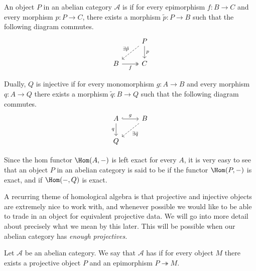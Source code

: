 \documentclass[main.tex]{subfiles}
\begin{document}
\begin{definition}
  \label{def:projective_injective}
  An object $P$ in an abelian category $\mathcal{A}$ is  if for every epimorphism $f\colon B \to C$ and every morphism $p\colon P \to C$, there exists a morphism $\tilde{p}\colon P \to B$ such that the following diagram commutes.
  \begin{equation*}
    \begin{tikzcd}
      & P
      \arrow[d, "p"]
      \arrow[dl, dashed, swap, "\exists\tilde{p}"]
      \\
      B
      \arrow[r, twoheadrightarrow, swap, "f"]
      & C
    \end{tikzcd}
  \end{equation*}

  Dually, $Q$ is injective if for every monomorphism $g\colon A \to B$ and every morphism $q\colon A \to Q$ there exists a morphism $\tilde{q}\colon B \to Q$ such that the following diagram commutes.
  \begin{equation*}
    \begin{tikzcd}
      A
      \arrow[r, hookrightarrow, "g"]
      \arrow[d, swap, "q"]
      & B
      \arrow[dl, dashed, "\exists \tilde{q}"]
      \\
      Q
    \end{tikzcd}
  \end{equation*}
\end{definition}

Since the hom functor $\Hom(A, -)$ is left exact for every $A$, it is very easy to see that an object $P$ in an abelian category is said to be  if the functor $\Hom(P, -)$ is exact, and  if $\Hom(-, Q)$ is exact.

A recurring theme of homological algebra is that projective and injective objects are extremely nice to work with, and whenever possible we would like to be able to trade in an object for equivalent projective data. We will go into more detail about precisely what we mean by this later. This will be possible when our abelian category has \emph{enough projectives.}

\begin{definition}
  \label{def:enough_projectives}
  Let $\mathcal{A}$ be an abelian category. We say that $\mathcal{A}$ has  if for every object $M$ there exists a projective object $P$ and an epimorphism $P \twoheadrightarrow M$.
\end{definition}
\end{document}
